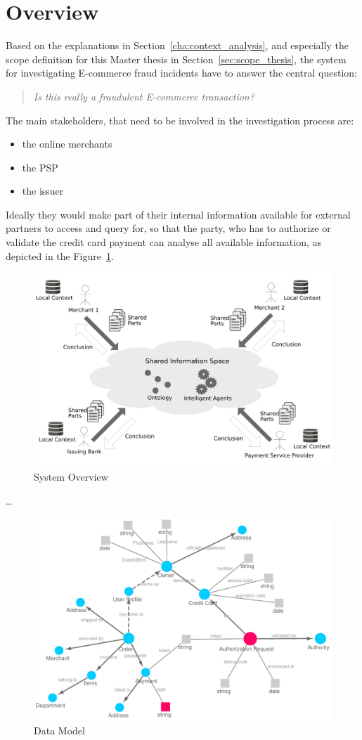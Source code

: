 
\section{Overview}
\label{sec:system_overview}

Based on the explanations in Section~\ref{cha:context_analysis}, and especially the scope definition for this Master thesis in Section~\ref{sec:scope_thesis}, the system for investigating E-commerce fraud incidents have to answer the central question:\@

\begin{quotation}
    \textit{Is this really a fraudulent E-commerce transaction?}
\end{quotation}

The main stakeholders, that need to be involved in the investigation process are:\@

\begin{itemize}
    \item the online merchants
    \item the \gls{PSP}
    \item the issuer
\end{itemize}

Ideally they would make part of their internal information available for external partners to access and query for, so that the party, who has to authorize or validate the credit card payment can analyse all available information, as depicted in the Figure~\ref{fig:images_system_overview}.

\begin{figure}[H]
	\centering
		\includegraphics[width=0.8\columnwidth]{images/system_overview.pdf}
	\caption{System Overview}
\label{fig:images_system_overview}
\end{figure}

\ldots


\begin{figure}[H]
	\centering
		\includegraphics[width=0.8\columnwidth]{images/ontology_scenario_1.pdf}
	\caption{Data Model}
\label{fig:images_data_model}
\end{figure}


